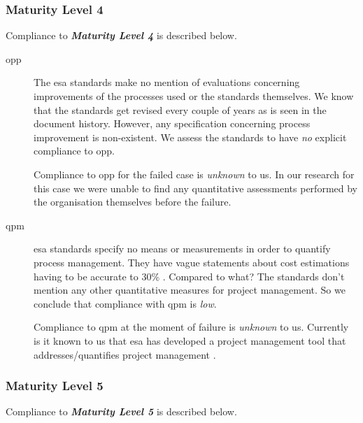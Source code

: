 \subsubsection{Maturity Level 4}
Compliance to \textbf{\textit{Maturity Level 4}} is described below. 

\begin{description}
\item[\ac{opp}]
The \ac{esa} standards make no mention of evaluations concerning improvements of the processes used or the standards themselves. We know that the standards get revised every couple of years as is seen in the document history. However, any specification concerning process improvement is non-existent.
We assess the standards to have \textit{no} explicit compliance to \ac{opp}.

Compliance to \ac{opp} for the failed case is \textit{unknown} to us. In our research for this case we were unable to find any quantitative assessments performed by the organisation themselves before the failure. 

\item[\ac{qpm}]
\ac{esa} standards specify no means or measurements in order to quantify process management. They have vague statements about cost estimations having to be accurate to 30\% \citep[42]{esaSEstandards1991}. Compared to what? The standards don't mention any other quantitative measures for project management.
So we conclude that compliance with \ac{qpm} is \textit{low}.

Compliance to \ac{qpm} at the moment of failure is \textit{unknown} to us. Currently is it known to us that \ac{esa} has developed a project management tool that addresses/quantifies project management \citep{esapmgmnt2016}.

\end{description}

\subsubsection{Maturity Level 5}
Compliance to \textbf{\textit{Maturity Level 5}} is described below. 

